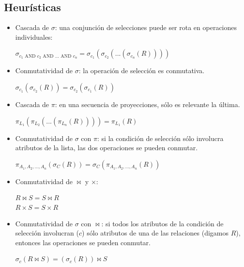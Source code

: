 \documentclass[]{article}
\begin{document}
\subsection{Heurísticas}
\begin{itemize}
    \item Cascada de $\sigma$: una conjunción de selecciones puede ser rota en operaciones individuales:
    \begin{center}
        $\sigma_{c_1\text{ AND }c_2\text{ AND } ... \text{ AND }c_n} = \sigma_{c_1}(\sigma_{c_2}( ... (\sigma_{c_n}(R))))$
    \end{center}
    \item Conmutatividad de $\sigma$: la operación de selección es conmutativa.
    \begin{center}
        $\sigma_{c_1}(\sigma_{c_2}(R)) = \sigma_{c_2}(\sigma_{c_1}(R))$
    \end{center}
    \item Cascada de $\pi$: en una secuencia de proyecciones, sólo es relevante la última.
    \begin{center}
        $\pi_{L_1}(\pi_{L_2}(...(\pi_{L_n}(R)))) = \pi_{L_1}(R)$
    \end{center}
    \item Conmutatividad de $\sigma$ con $\pi$: si la condición de selección sólo involucra atributos de la lista, las dos operaciones se pueden conmutar.
    \begin{center}
        $\pi_{A_1, A_2, ..., A_n}(\sigma_{C}(R)) = \sigma_C(\pi_{A_1, A_2, ..., A_n}(R))$
    \end{center}
    \item Conmutatividad de $\bowtie$ y $\times$:
    \begin{center}
        $R \bowtie S = S \bowtie R$\\
        $R \times S = S \times R$
    \end{center}
    \item Conmutatividad de $\sigma$ con $\bowtie$: si todos los atributos de la condición de selección involucran ($c$) sólo atributos de una de las relaciones (digamos $R$), entonces las operaciones se pueden conmutar.
    \begin{center}
        $\sigma_c(R\bowtie S) = (\sigma_c(R))\bowtie S$
    \end{center}


\end{itemize}
\end{document}
